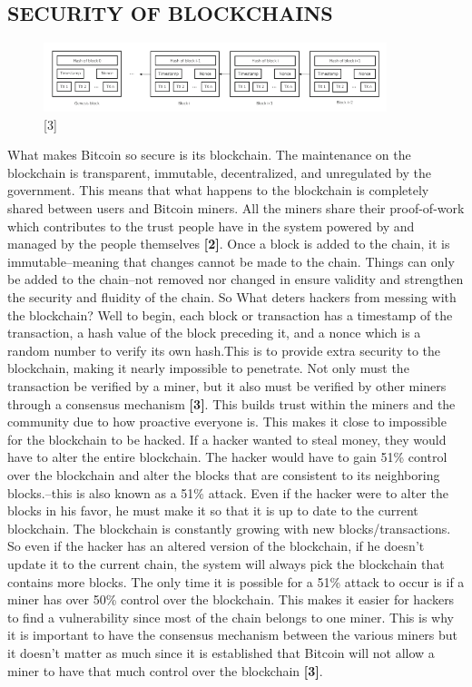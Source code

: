 \documentclass[letterpaper, 10 pt, conference]{ieeeconf}  %
\begin{document}
\subsection{SECURITY OF BLOCKCHAINS}
\begin{figure}[h!]
  \includegraphics[width=10cm]{blockchain.PNG}
  \caption*{[3]}
\end{figure}
What makes Bitcoin so secure is its blockchain. The maintenance on the blockchain is transparent, immutable, decentralized, and unregulated by the government. This means that what happens to the blockchain is completely shared between users and Bitcoin miners. All the miners share their proof-of-work which contributes to the trust people have in the system powered by and managed by the people themselves \textbf{[2]}. Once a block is added to the chain, it is immutable--meaning that changes cannot be made to the chain. Things can only be added to the chain--not removed nor changed in ensure validity and strengthen the security and fluidity of the chain. So What deters hackers from messing with the blockchain? Well to begin, each block or transaction has a timestamp of the transaction, a hash value of the block preceding it, and a nonce which is a random number to verify its own hash.This is to provide extra security to the blockchain, making it nearly impossible to penetrate. Not only must the transaction be verified by a miner, but it also must be verified by other miners through a consensus mechanism \textbf{[3]}. This builds trust within the miners and the community due to how proactive everyone is. This makes it close to impossible for the blockchain to be hacked. If a hacker wanted to steal money, they would have to alter the entire blockchain. The hacker would have to gain 51\% control over the blockchain and alter the blocks that are consistent to its neighboring blocks.--this is also known as a 51\% attack. Even if the hacker were to alter the blocks in his favor, he must make it so that it is up to date to the current blockchain. The blockchain is constantly growing with new blocks/transactions. So even if the hacker has an altered version of the blockchain, if he doesn't update it to the current chain, the system will always pick the blockchain that contains more blocks. The only time it is possible for a 51\% attack to occur is if a miner has over 50\% control over the blockchain. This makes it easier for hackers to find a vulnerability since most of the chain belongs to one miner. This is why it is important to have the consensus mechanism between the various miners but it doesn't matter as much since it is established that Bitcoin will not allow a miner to have that much control over the blockchain \textbf{[3]}.
\end{document}

